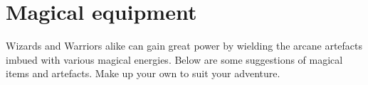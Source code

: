 %






\section*{Magical equipment}

Wizards and Warriors alike can gain great power by wielding the arcane artefacts imbued with various magical energies. Below are some suggestions of magical items and artefacts. Make up your own to suit your adventure.

\


